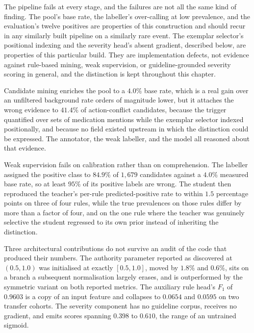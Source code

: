 The pipeline fails at every stage, and the failures are not all the same kind
of finding. The pool's base rate, the labeller's over-calling at low
prevalence, and the evaluation's twelve positives are properties of this
construction and should recur in any similarly built pipeline on a similarly
rare event. The exemplar selector's positional indexing and the severity
head's absent gradient, described below, are properties of this particular
build. They are implementation defects, not evidence against rule-based
mining, weak supervision, or guideline-grounded severity scoring in general,
and the distinction is kept throughout this chapter.

Candidate mining enriches the pool to a $4.0\%$ base rate, which is a real gain
over an unfiltered background rate orders of magnitude lower, but it attaches
the wrong evidence to $41.4\%$ of action-conflict candidates, because the trigger
quantified over sets of medication mentions while the exemplar selector indexed
positionally, and because no field existed upstream in which the distinction
could be expressed. The annotator, the weak labeller, and the model all reasoned
about that evidence.

Weak supervision fails on calibration rather than on comprehension. The labeller
assigned the positive class to $84.9\%$ of $1{,}679$ candidates against a $4.0\%$
measured base rate, so at least $95\%$ of its positive labels are wrong. The
student then reproduced the teacher's per-rule predicted-positive rate to within
$1.5$ percentage points on three of four rules, while the true prevalences on
those rules differ by more than a factor of four, and on the one rule where the
teacher was genuinely selective the student regressed to its own prior instead
of inheriting the distinction.

Three architectural contributions do not survive an audit of the code that
produced their numbers. The authority parameter reported as discovered at
$(0.5, 1.0)$ was initialised at exactly $[0.5, 1.0]$, moved by $1.8\%$ and
$0.6\%$, sits on a branch a subsequent normalisation largely erases, and is
outperformed by the symmetric variant on both reported metrics. The auxiliary
rule head's $F_1$ of $0.9603$ is a copy of an input feature and collapses to
$0.0654$ and $0.0595$ on two transfer cohorts. The severity component has no
guideline corpus, receives no gradient, and emits scores spanning $0.398$ to
$0.610$, the range of an untrained sigmoid.

